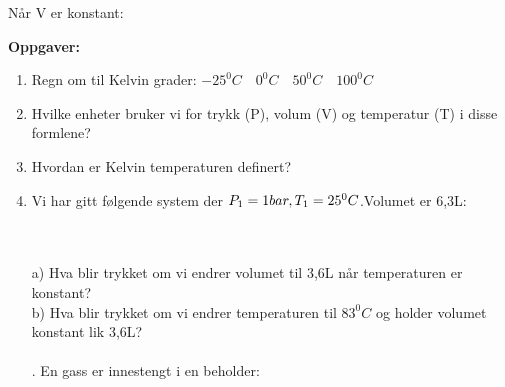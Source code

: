 \documentclass[12pt,a4paper]{article}
\begin{document}
Når V er konstant:\\
\begin{center}
\end{center}\newpage\noindent
\textbf{Oppgaver:}\\ %
\begin{enumerate}
    \item Regn om til Kelvin grader: $-25^0C\quad 0^0C \quad 50^0C \quad 100^0C$
    \item Hvilke enheter bruker vi for trykk (P), volum (V) og temperatur (T) i disse formlene?
    \item Hvordan er Kelvin temperaturen definert?
    \item Vi har gitt følgende system der $P_1=1bar,
    \\ T_1=25^0C$.\quad Volumet er 6,3L:
     \begin{figure}[h]
    \vspace{2cm}  %
\end{figure}\\\\
a) Hva blir trykket om vi endrer volumet til 3,6L når temperaturen er konstant?\\
b) Hva blir trykket om vi endrer temperaturen til $83^0C$ og holder volumet konstant
lik 3,6L?\\\\
. En gass er innestengt i en beholder:
     \begin{figure}[h]
    \vspace{1cm}  %
\end{figure}
\end{enumerate}
\end{document}
